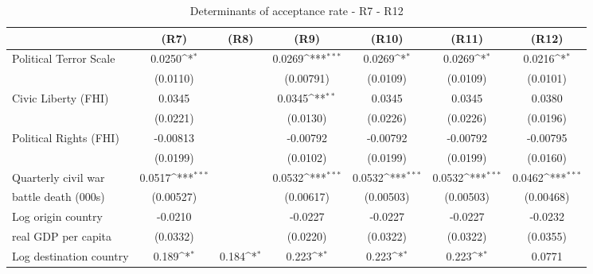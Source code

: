 \begin{table}[!ht]\centering \scriptsize
\def\sym#1{\ifmmode^{#1}\else\(^{#1}\)\fi}
\caption{Determinants of acceptance rate - R7 - R12}
\begin{tabular}{l*{6}{c}}
\hline\hline
                    &\multicolumn{1}{c}{(R7)}&\multicolumn{1}{c}{(R8)}&\multicolumn{1}{c}{(R9)}&\multicolumn{1}{c}{(R10)}&\multicolumn{1}{c}{(R11)}&\multicolumn{1}{c}{(R12)}\\                  
\hline
Political Terror Scale&      0.0250\sym{*}  &                     &      0.0269\sym{***}&      0.0269\sym{*}  &      0.0269\sym{*}  &      0.0216\sym{*}  \\
                    &    (0.0110)         &                     &   (0.00791)         &    (0.0109)         &    (0.0109)         &    (0.0101)         \\
[0,5em]
Civic Liberty (FHI) &      0.0345         &                     &      0.0345\sym{**} &      0.0345         &      0.0345         &      0.0380         \\
                    &    (0.0221)         &                     &    (0.0130)         &    (0.0226)         &    (0.0226)         &    (0.0196)         \\
[0,5em]
Political Rights (FHI)&    -0.00813         &                     &    -0.00792         &    -0.00792         &    -0.00792         &    -0.00795         \\
                    &    (0.0199)         &                     &    (0.0102)         &    (0.0199)         &    (0.0199)         &    (0.0160)         \\
[0,5em]
Quarterly civil war &      0.0517\sym{***}&                     &      0.0532\sym{***}&      0.0532\sym{***}&      0.0532\sym{***}&      0.0462\sym{***}\\
battle death (000s)                    &   (0.00527)         &                     &   (0.00617)         &   (0.00503)         &   (0.00503)         &   (0.00468)         \\
[0,5em]
Log origin country &     -0.0210         &                     &     -0.0227         &     -0.0227         &     -0.0227         &     -0.0232         \\
real GDP per capita                    &    (0.0332)         &                     &    (0.0220)         &    (0.0322)         &    (0.0322)         &    (0.0355)         \\
[0,5em]
Log destination country&       0.189\sym{*}  &       0.184\sym{*}  &       0.223\sym{*}  &       0.223\sym{*}  &       0.223\sym{*}  &      0.0771         \\

\end{tabular}
\end{table}
